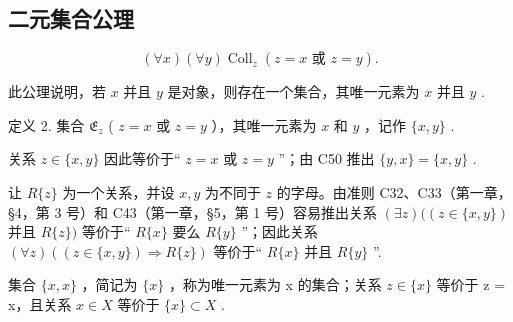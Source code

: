 \subsection{二元集合公理}

\[
(\forall x) (\forall y) \operatorname{Coll} _ {z} (z = x \text {   或   } z = y).
\]

此公理说明，若 \(x\) 并且 \(y\) 是对象，则存在一个集合，其唯一元素为 \(x\) 并且 \(y\) .

定义 2. 集合 \(\mathfrak{E}_z\) ( \(z = x\) 或 \(z = y\) ），其唯一元素为 \(x\) 和 \(y\) ，记作 \(\{x, y\}\) .

关系 \(z \in \{x, y\}\) 因此等价于“ \(z = x\) 或 \(z = y\) ”；由 C50 推出 \(\{y, x\} = \{x, y\}\) .

让 \(R\{z\}\) 为一个关系，并设 \(x, y\) 为不同于 \(z\) 的字母。由准则 C32、C33（第一章，§4，第 3 号）和 C43（第一章，§5，第 1 号）容易推出关系 \((\exists z)((z \in \{x, y\})\) 并且 \(R\{z\})\) 等价于“ \(R\{x\}\) 要么 \(R\{y\}\) ”；因此关系 \((\forall z)((z \in \{x, y\}) \Longrightarrow R\{z\})\) 等价于“ \(R\{x\}\) 并且 \(R\{y\}\) ''.

集合 \(\{x, x\}\) ，简记为 \(\{x\}\) ，称为唯一元素为 x 的集合；关系 \(z \in \{x\}\) 等价于 z = x，且关系 \(x \in X\) 等价于 \(\{x\} \subset X\) .

